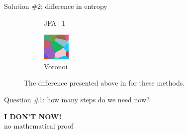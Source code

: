 \documentclass[aspectratio=169, 22pt]{beamer}
\begin{document}
\begin{frame}{Solution \#2: difference in entropy}
\begin{figure}
\begin{subfigure}{.3\textwidth}
	\caption{JFA+1}
  \label{fig:sub2}
\end{subfigure}
\begin{subfigure}{.3\textwidth}
  \centering
  \includegraphics[width=0.8\linewidth]{./zoomf.png}
	\caption{Voronoi}
  \label{fig:sub2}
\end{subfigure}

	\caption{The difference presented above in for these methods.}
\label{fig:test}
\end{figure}

\end{frame}


\begin{frame}{Question \#1: how many steps do we need now?}

\centering\textbf{I DON'T NOW!} \\
no mathematical proof

\end{frame}

\end{document}

